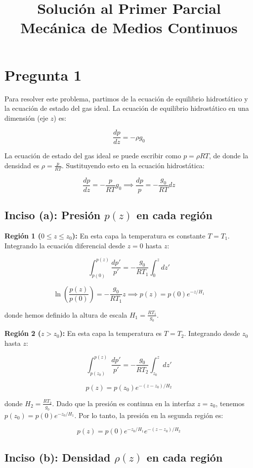 \documentclass{article}
\title{Solución al Primer Parcial \\ Mecánica de Medios Continuos}
\author{}
\date{}
\begin{document}
\maketitle

\section{Pregunta 1}

Para resolver este problema, partimos de la ecuación de equilibrio hidrostático y la ecuación de estado del gas ideal. La ecuación de equilibrio hidrostático en una dimensión (eje $z$) es:

$$ \frac{dp}{dz} = -\rho g_0 $$

La ecuación de estado del gas ideal se puede escribir como $p = \rho R T$, de donde la densidad es $\rho = \frac{p}{RT}$. Sustituyendo esto en la ecuación hidrostática:

$$ \frac{dp}{dz} = -\frac{p}{RT} g_0 \implies \frac{dp}{p} = -\frac{g_0}{RT} dz $$

\subsection{Inciso (a): Presión $p(z)$ en cada región}

\textbf{Región 1 ($0 \le z \le z_0$):}
En esta capa la temperatura es constante $T = T_1$. Integrando la ecuación diferencial desde $z=0$ hasta $z$:

$$ \int_{p(0)}^{p(z)} \frac{dp'}{p'} = -\frac{g_0}{R T_1} \int_0^z dz' $$

$$ \ln\left(\frac{p(z)}{p(0)}\right) = -\frac{g_0}{R T_1} z \implies p(z) = p(0) e^{-z/H_1} $$

donde hemos definido la altura de escala $H_1 = \frac{R T_1}{g_0}$.

\textbf{Región 2 ($z > z_0$):}
En esta capa la temperatura es $T = T_2$. Integrando desde $z_0$ hasta $z$:

$$ \int_{p(z_0)}^{p(z)} \frac{dp'}{p'} = -\frac{g_0}{R T_2} \int_{z_0}^z dz' $$

$$ p(z) = p(z_0) e^{-(z-z_0)/H_2} $$

donde $H_2 = \frac{R T_2}{g_0}$. Dado que la presión es continua en la interfaz $z=z_0$, tenemos $p(z_0) = p(0) e^{-z_0/H_1}$. Por lo tanto, la presión en la segunda región es:

$$ p(z) = p(0) e^{-z_0/H_1} e^{-(z-z_0)/H_2} $$

\subsection{Inciso (b): Densidad $\rho(z)$ en cada región}
\end{document}

